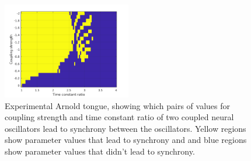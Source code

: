 \documentclass[a4paper]{scrartcl}
\begin{document}
\begin{figure}[!h]
	\centering
	\includegraphics[width=0.5\textwidth]{fig/figurebonus_arnold.png}
	\caption{Experimental Arnold tongue, showing which pairs of values for coupling strength and time constant ratio of two coupled neural oscillators lead to synchrony between the oscillators. Yellow regions show parameter values that lead to synchrony and and blue regions show parameter values that didn't lead to synchrony.}
	\label{fig:bonus}
\end{figure}
	
\end{document}
